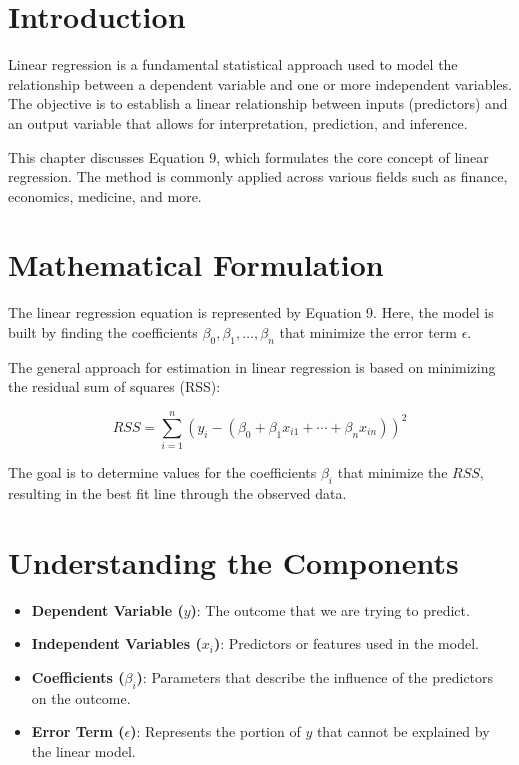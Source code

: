 \documentclass[
  12 pt,
  a4paper,
]{book}
\providecommand{\tightlist}{%
  \setlength{\itemsep}{0pt}\setlength{\parskip}{0pt}}
\numberwithin{equation}{section}
\theoremstyle{plain}      %
\theoremstyle{definition} %
\theoremstyle{remark}     %
\theoremstyle{note}         %
\begin{document}
\newpage

\hypertarget{introduction}{%
\section{Introduction}\label{introduction}}

Linear regression is a fundamental statistical approach used to model
the relationship between a dependent variable and one or more
independent variables. The objective is to establish a linear
relationship between inputs (predictors) and an output variable that
allows for interpretation, prediction, and inference.

This chapter discusses Equation 9, which formulates the core concept of
linear regression. The method is commonly applied across various fields
such as finance, economics, medicine, and more.

\hypertarget{mathematical-formulation}{%
\section{Mathematical Formulation}\label{mathematical-formulation}}

The linear regression equation is represented by Equation 9. Here, the
model is built by finding the coefficients
\(\beta_0, \beta_1, \ldots, \beta_n\) that minimize the error term
\(\epsilon\).

The general approach for estimation in linear regression is based on
minimizing the residual sum of squares (RSS):

\[
RSS = \sum_{i=1}^n (y_i - (\beta_0 + \beta_1 x_{i1} + \cdots + \beta_n x_{in}))^2
\]

The goal is to determine values for the coefficients \(\beta_i\) that
minimize the \(RSS\), resulting in the best fit line through the
observed data.

\hypertarget{understanding-the-components}{%
\section{Understanding the
Components}\label{understanding-the-components}}

\begin{itemize}
\tightlist
\item
  \textbf{Dependent Variable (\(y\))}: The outcome that we are trying to
  predict.
\item
  \textbf{Independent Variables (\(x_i\))}: Predictors or features used
  in the model.
\item
  \textbf{Coefficients (\(\beta_i\))}: Parameters that describe the
  influence of the predictors on the outcome.
\item
  \textbf{Error Term (\(\epsilon\))}: Represents the portion of \(y\)
  that cannot be explained by the linear model.
\end{itemize}
\end{document}
